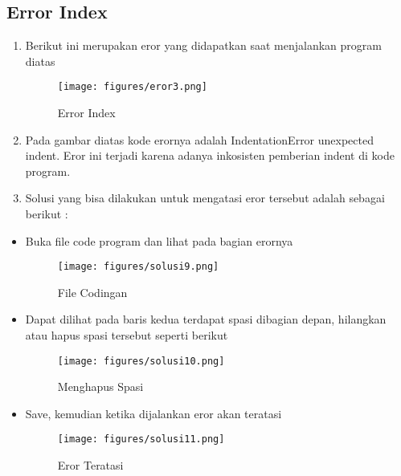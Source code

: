 \subsection{Error Index}
\begin{enumerate}
	\item
Berikut ini merupakan eror yang didapatkan saat menjalankan program diatas
\begin{figure}[ht]
\centering
\texttt{[image: figures/eror3.png]}
\caption{Error Index}
\label{Error}
\end{figure}
	\item
Pada gambar diatas kode erornya adalah IndentationError unexpected indent. Eror ini terjadi karena adanya inkosisten pemberian indent di kode program.
	\item
Solusi yang bisa dilakukan untuk mengatasi eror tersebut adalah sebagai berikut : 
\end{enumerate}
\begin{itemize}
\item
Buka file code program dan lihat pada bagian erornya
\begin{figure}[ht]
\centering
\texttt{[image: figures/solusi9.png]}
\caption{File Codingan}
\label{Eror}
\end{figure}
\item
Dapat dilihat pada baris kedua terdapat spasi dibagian depan, hilangkan atau hapus spasi tersebut seperti berikut 
\begin{figure}[ht]
\centering
\texttt{[image: figures/solusi10.png]}
\caption{Menghapus Spasi}
\label{Eror}
\end{figure}
\item Save, kemudian ketika dijalankan eror akan teratasi
\begin{figure}[ht]
\centering
\texttt{[image: figures/solusi11.png]}
\caption{Eror Teratasi}
\label{Eror}
\end{figure}
\end{itemize}
